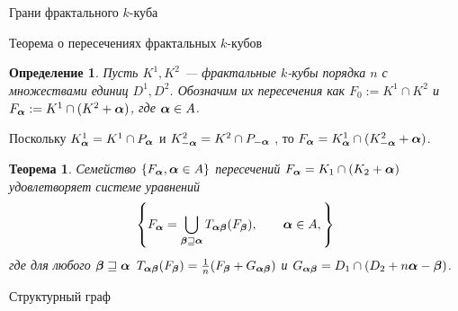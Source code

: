 \documentclass[aspectratio=1610, 10pt, notheorems]{beamer}
\newtheorem{theorem}     {Теорема}
\newtheorem{lemma}       {Лемма}
\newtheorem{definition}  {Определение}
\begin{document}
\begin{frame}{Грани фрактального $k$-куба}
\end{frame}


\begin{frame}{Теорема о пересечениях фрактальных $k$-кубов}
\begin{definition}
Пусть $K^1,K^2$ --- фрактальные $k$-кубы порядка $n$ с множествами единиц $D^1,D^2$.
Обозначим их пересечения как $F_0:=K^1\cap K^2$ и $F_{\bm{\alpha}}:=K^1\cap (K^2+{\bm{\alpha}})$, где ${\bm{\alpha}}\in A$.
\end{definition}
Поскольку   $K_{{\bm{\alpha}}}^1=K^1\cap  P_{\bm{\alpha}}$ и $K_{-{\bm{\alpha}}}^2=K^2\cap P_{-{\bm{\alpha}}}$ , то $F_{\bm{\alpha}}=K_{{\bm{\alpha}}}^1\cap(K_{-{\bm{\alpha}}}^2+{\bm{\alpha}})$.
\begin{theorem}
Семейство $\{F_{\bm{\alpha}}, {\bm{\alpha}}\in A\}$ пересечений $F_{\bm{\alpha}} =K_{1}\cap (K_{2}+{\bm{\alpha}})$  
удовлетворяет системе уравнений
\begin{equation*}
\left\{F_{\bm{\alpha}}=\bigcup\limits_{{\bm{\beta}}\sqsupseteq{{\bm{\alpha}}}}T_{{\bm{\alpha}}{\bm{\beta}}}(F_{\bm{\beta}}),\qquad {\bm{\alpha}}\in A,\right\}
\end{equation*}
где для любого ${\bm{\beta}}\sqsupseteq{\bm{\alpha}}$ $T_{{\bm{\alpha}}{\bm{\beta}}}(F_{\bm{\beta}})=\frac{1}{n}(F_{\bm{\beta}}+G_{{\bm{\alpha}}{\bm{\beta}}})$ и $G_{{\bm{\alpha}}{\bm{\beta}}}=D_1\cap(D_2+n{\bm{\alpha}}-{\bm{\beta}})$.\\
\end{theorem}
\end{frame}


\begin{frame}{Структурный граф}
\end{frame}
\end{document}
